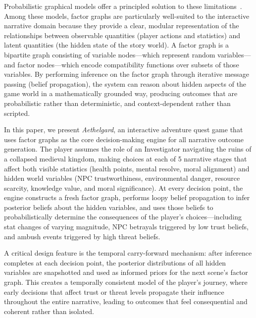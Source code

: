 \documentclass[journal]{IEEEtran}
\begin{document}
Probabilistic graphical models offer a principled solution to these limitations~\cite{ref2,ref3}. Among these models, factor graphs are particularly well-suited to the interactive narrative domain because they provide a clear, modular representation of the relationships between observable quantities (player actions and statistics) and latent quantities (the hidden state of the story world). A factor graph is a bipartite graph consisting of variable nodes---which represent random variables---and factor nodes---which encode compatibility functions over subsets of those variables. By performing inference on the factor graph through iterative message passing (belief propagation), the system can reason about hidden aspects of the game world in a mathematically grounded way, producing outcomes that are probabilistic rather than deterministic, and context-dependent rather than scripted.

In this paper, we present \textit{Aethelgard}, an interactive adventure quest game that uses factor graphs as the core decision-making engine for all narrative outcome generation. The player assumes the role of an Investigator navigating the ruins of a collapsed medieval kingdom, making choices at each of 5 narrative stages that affect both visible statistics (health points, mental resolve, moral alignment) and hidden world variables (NPC trustworthiness, environmental danger, resource scarcity, knowledge value, and moral significance). At every decision point, the engine constructs a fresh factor graph, performs loopy belief propagation to infer posterior beliefs about the hidden variables, and uses those beliefs to probabilistically determine the consequences of the player's choices---including stat changes of varying magnitude, NPC betrayals triggered by low trust beliefs, and ambush events triggered by high threat beliefs.

A critical design feature is the temporal carry-forward mechanism: after inference completes at each decision point, the posterior distributions of all hidden variables are snapshotted and used as informed priors for the next scene's factor graph. This creates a temporally consistent model of the player's journey, where early decisions that affect trust or threat levels propagate their influence throughout the entire narrative, leading to outcomes that feel consequential and coherent rather than isolated.
\end{document}
